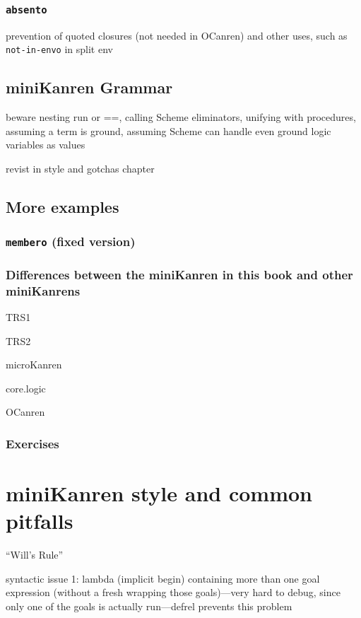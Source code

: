\documentclass{book}
\begin{document}
\subsection{\texttt{absento}}

prevention of quoted closures (not needed in OCanren) and other uses,
such as \texttt{not-in-envo} in split env

\section{miniKanren Grammar}

beware nesting run or ==, calling Scheme eliminators, unifying with procedures, assuming a term is ground, assuming Scheme can handle even ground logic variables as values

revist in style and gotchas chapter

\section{More examples}

\subsection{\texttt{membero} (fixed version)}

\subsection{Differences between the miniKanren in this book and other miniKanrens}

TRS1

TRS2

microKanren

core.logic

OCanren

\subsection{Exercises}


\chapter{miniKanren style and common pitfalls}%

``Will's Rule''

syntactic issue 1:
lambda (implicit begin) containing more than one goal expression (without a fresh wrapping those goals)---very hard to debug, since only one of the goals is actually run---defrel prevents this problem
\end{document}
